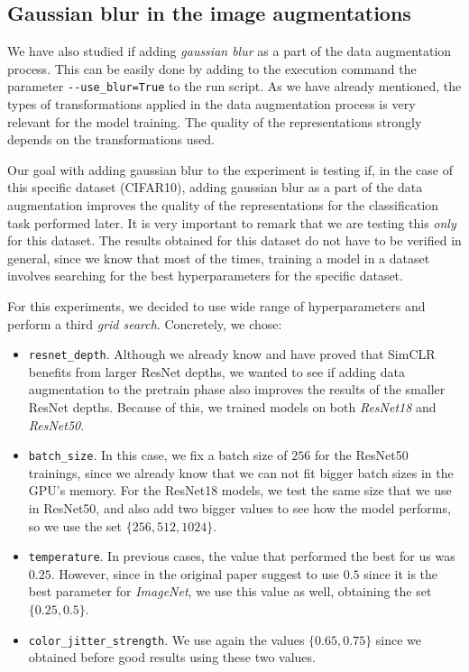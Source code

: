 \subsection{Gaussian blur in the image augmentations}
\label{exp3:adding:blur}

We have also studied if adding \emph{gaussian blur} as a part of the data augmentation process. This can be easily done by adding to the execution command the parameter \lstinline{--use_blur=True} to the run script. As we have already mentioned, the types of transformations applied in the data augmentation process is very relevant for the model training. The quality of the representations strongly depends on the transformations used.

Our goal with adding gaussian blur to the experiment is testing if, in the case of this specific dataset (CIFAR10), adding gaussian blur as a part of the data augmentation improves the quality of the representations for the classification task performed later. It is very important to remark that we are testing this \emph{only} for this dataset. The results obtained for this dataset do not have to be verified in general, since we know that most of the times, training a model in a dataset involves searching for the best hyperparameters for the specific dataset.

For this experiments, we decided to use wide range of hyperparameters and perform a third \emph{grid search}. Concretely, we chose:
\begin{itemize}
\item \lstinline{resnet_depth}. Although we already know and have proved that SimCLR benefits from larger ResNet depths, we wanted to see if adding data augmentation to the pretrain phase also improves the results of the smaller ResNet depths. Because of this, we trained models on both \emph{ResNet18} and \emph{ResNet50}.
\item \lstinline{batch_size}. In this case, we fix a batch size of $256$ for the ResNet50 trainings, since we already know that we can not fit bigger batch sizes in the GPU's memory. For the ResNet18 models, we test the same size that we use in ResNet50, and also add two bigger values to see how the model performs, so we use the set $\{256,512,1024\}$.
\item \lstinline{temperature}. In previous cases, the value that performed the best for us was $0.25$. However, since in the original paper suggest to use $0.5$ since it is the best parameter for \emph{ImageNet}, we use this value as well, obtaining the set $\{0.25,0.5\}$.
\item \lstinline{color_jitter_strength}. We use again the values $\{0.65,0.75\}$ since we obtained before good results using these two values.
\end{itemize}

